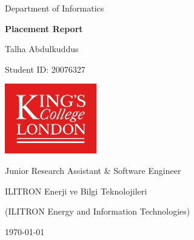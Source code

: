 \begin{titlepage}
    \begin{center}
        \small
        Department of Informatics

        \Huge
        \textbf{Placement Report}

        \vspace{25mm}
        \LARGE
        Talha Abdulkuddus

        \small
        Student ID\@: 20076327

        \vfill

        \includegraphics[width=40mm]{KCL-Logo} %

        \vfill

        \large
        Junior Research Assistant \& Software Engineer

        ILITRON Enerji ve Bilgi Teknolojileri

        \small
        (ILITRON Energy and Information Technologies)

        \vspace{15mm}
        \Large
        \today
    \end{center}
\end{titlepage}
